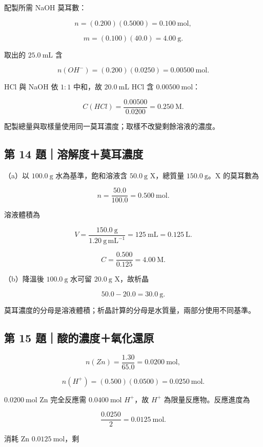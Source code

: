 \documentclass[11pt,a4paper]{article}
\begin{document}
配製所需 NaOH 莫耳數：

\[
n=(0.200)(0.5000)=0.100\ \mathrm{mol},
\]

\[
m=(0.100)(40.0)=4.00\ \mathrm g.
\]

取出的 \(25.0\ \mathrm{mL}\) 含

\[
n(OH^-)=(0.200)(0.0250)=0.00500\ \mathrm{mol}.
\]

HCl 與 NaOH 依 \(1:1\) 中和，故 \(20.0\ \mathrm{mL}\) HCl 含 \(0.00500\ \mathrm{mol}\)：

\[
C(HCl)=\frac{0.00500}{0.0200}=0.250\ \mathrm M.
\]

配製總量與取樣量使用同一莫耳濃度；取樣不改變剩餘溶液的濃度。

\subsection{第 14 題｜溶解度＋莫耳濃度}\label{ux7b2c-14-ux984cux6eb6ux89e3ux5ea6ux83abux8033ux6fc3ux5ea6}

（a）以 \(100.0\ \mathrm g\) 水為基準，飽和溶液含 \(50.0\ \mathrm g\) X，總質量 \(150.0\ \mathrm g\)。X 的莫耳數為

\[
n=\frac{50.0}{100.0}=0.500\ \mathrm{mol}.
\]

溶液體積為

\[
V=\frac{150.0\ \mathrm g}{1.20\ \mathrm{g\,mL^{-1}}}
=125\ \mathrm{mL}=0.125\ \mathrm L.
\]

\[
C=\frac{0.500}{0.125}=4.00\ \mathrm M.
\]

（b）降溫後 \(100.0\ \mathrm g\) 水可留 \(20.0\ \mathrm g\) X，故析晶

\[
50.0-20.0=30.0\ \mathrm g.
\]

莫耳濃度的分母是溶液體積；析晶計算的分母是水質量，兩部分使用不同基準。

\subsection{第 15 題｜酸的濃度＋氧化還原}\label{ux7b2c-15-ux984cux9178ux7684ux6fc3ux5ea6ux6c27ux5316ux9084ux539f}

\[
n(Zn)=\frac{1.30}{65.0}=0.0200\ \mathrm{mol},
\]

\[
n(H^+)=(0.500)(0.0500)=0.0250\ \mathrm{mol}.
\]

\(0.0200\ \mathrm{mol}\) Zn 完全反應需 \(0.0400\ \mathrm{mol}\) \(H^+\)，故 \(H^+\) 為限量反應物。反應進度為

\[
\frac{0.0250}{2}=0.0125\ \mathrm{mol}.
\]

消耗 Zn \(0.0125\ \mathrm{mol}\)，剩
\end{document}
